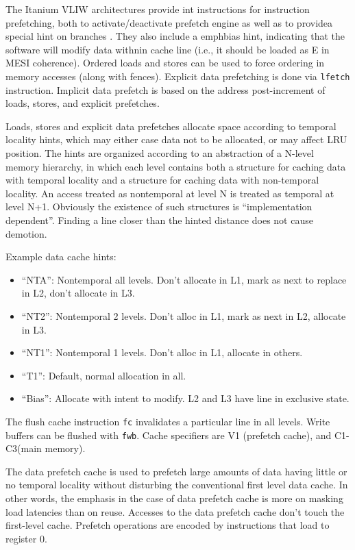 The Itanium VLIW architectures provide int instructions for instruction prefetching, both to activate/deactivate prefetch engine as well as to providea special hint on branches \cite{itanium, itanium}.
They also include a emph{bias hint}, indicating that the software will modify data withnin cache line (i.e., it should be loaded as E in MESI coherence).
Ordered loads and stores can be used to force ordering in memory accesses (along with fences).
Explicit data prefetching is done via \verb=lfetch= instruction. Implicit data prefetch is based on the address post-increment of loads, stores, and explicit prefetches.

Loads, stores and explicit data prefetches allocate space according to temporal locality hints, which may either case data not to be allocated, or may affect LRU position. The hints are organized according to an abstraction of a N-level memory hierarchy, in which each level contains both a structure for caching data with temporal locality and a structure for caching data with non-temporal locality. An access treated as nontemporal at level N is treated as temporal at level N+1. Obviously the existence of such structures is ``implementation dependent''. Finding a line closer than the hinted distance does not cause demotion.

Example data cache hints:
\begin{itemize}
\item ``NTA'': Nontemporal all levels. Don't allocate in L1, mark as next to replace in L2, don't allocate in L3.
\item ``NT2'': Nontemporal 2 levels. Don't alloc in L1, mark as next in L2, allocate in L3.
\item ``NT1'': Nontemporal 1 levels. Don't alloc in L1, allocate in others.
\item ``T1'': Default, normal allocation in all.
\item ``Bias'': Allocate with intent to modify. L2 and L3 have line in exclusive state.
\end{itemize}

The flush cache instruction \verb=fc= invalidates a particular line in all levels. Write buffers can be flushed with \verb=fwb=.
Cache specifiers are V1 (prefetch cache), and C1-C3(main memory).

The data prefetch cache is used to prefetch large amounts of data having little or no temporal locality without disturbing the conventional first level data cache. In other words, the emphasis in the case of data prefetch cache is more on masking load latencies than on reuse. Accesses to the data prefetch cache don't touch the first-level cache. Prefetch operations are encoded by instructions that load to register 0.

